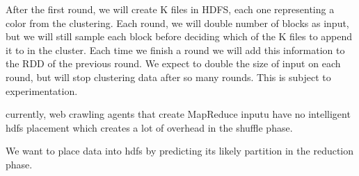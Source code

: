 \documentclass[14pt]{extarticle}
\begin{document}
After the first round, we will create K files in HDFS, each one representing a color from the clustering.   Each round, we will double number of blocks as input, but we will still sample each block before deciding which of the K files to append it to in the cluster.  Each time we finish a round we will add this information to the RDD of the previous round.  We expect to double the size of input on each round, but will stop clustering data after so many rounds.  This is subject to experimentation.  


currently, web crawling agents 
that create MapReduce inputu
have no intelligent hdfs placement which 
creates a lot of overhead in the shuffle
phase.



We want to place data into hdfs by predicting 
its likely partition in the reduction
phase.
\end{document}
